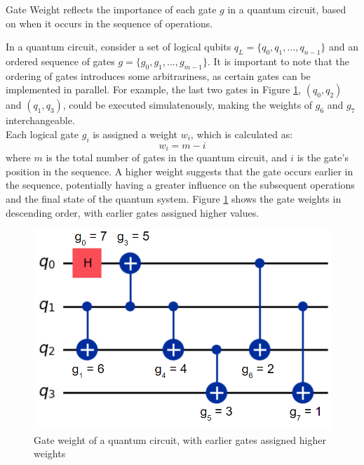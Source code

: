 \begin{definition} %
    Gate Weight reflects the importance of each gate $g$ in a quantum circuit, based on when it occurs in the sequence of operations.
\end{definition}
In a quantum circuit, consider a set of logical qubits $q_L = \{q_0, q_1, ..., q_{n-1}\}$ and an ordered sequence of gates $g = \{g_0, g_1, ..., g_{m-1}\}$. It is important to note that the ordering of gates introduces some arbitrariness, as certain gates can be implemented in parallel. For example, the last two gates in Figure \ref{fig:gate-weight}, $(q_0, q_2)$ and $(q_1, q_3)$, could be executed simulatenously, making the weights of $g_6$ and $g_7$ interchangeable. \\
Each logical gate $g_i$ is assigned a  weight $w_i$, which is calculated as:
\begin{equation}
    w_i = m - i
\end{equation}
where $m$ is the total number of gates in the quantum circuit, and $i$ is the gate's position in the sequence. A higher weight suggests that the gate occurs earlier in the sequence, potentially having a greater influence on the subsequent operations and the final state of the quantum system. Figure \ref{fig:gate-weight} shows the gate weights in descending order, with earlier gates assigned higher values.
\begin{figure}[h]
    \centering
    \includegraphics[width=0.4\linewidth]{image/gate_weight.png}
    \caption{Gate weight of a quantum circuit, with earlier gates assigned higher weights}
    \label{fig:gate-weight}
\end{figure}

